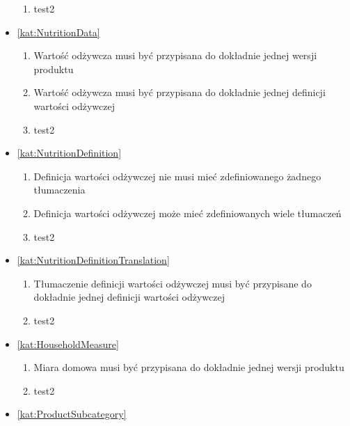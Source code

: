 \begin{itemize}[label={\textbf{Reguły dla}}, wide, labelwidth=!, labelindent=0pt]
\begin{enumerate}[label={\textbf{REG/\protect\threedigits{\arabic{enumi}}}}, wide, labelwidth=!, align=left, leftmargin=3cm, resume]
        \item test2
    \end{enumerate}
    \item\ref{kat:NutritionData}
    \begin{enumerate}[label={\textbf{REG/\protect\threedigits{\arabic{enumi}}}}, wide, labelwidth=!, align=left, leftmargin=3cm, resume]
        \item Wartość odżywcza musi być przypisana do dokładnie jednej wersji produktu
        \item Wartość odżywcza musi być przypisana do dokładnie jednej definicji wartości odżywczej
        \item test2
    \end{enumerate}
    \item\ref{kat:NutritionDefinition}
    \begin{enumerate}[label={\textbf{REG/\protect\threedigits{\arabic{enumi}}}}, wide, labelwidth=!, align=left, leftmargin=3cm, resume]
        \item Definicja wartości odżywczej nie musi mieć zdefiniowanego żadnego tłumaczenia
        \item Definicja wartości odżywczej może mieć zdefiniowanych wiele tłumaczeń
        \item test2
    \end{enumerate}
    \item\ref{kat:NutritionDefinitionTranslation}
    \begin{enumerate}[label={\textbf{REG/\protect\threedigits{\arabic{enumi}}}}, wide, labelwidth=!, align=left, leftmargin=3cm, resume]
        \item Tłumaczenie definicji wartości odżywczej musi być przypisane do dokładnie jednej definicji wartości odżywczej
        \item test2
    \end{enumerate}
    \item\ref{kat:HouseholdMeasure}
    \begin{enumerate}[label={\textbf{REG/\protect\threedigits{\arabic{enumi}}}}, wide, labelwidth=!, align=left, leftmargin=3cm, resume]
        \item Miara domowa musi być przypisana do dokładnie jednej wersji produktu
        \item test2
    \end{enumerate}
    \item\ref{kat:ProductSubcategory}

\end{itemize}

